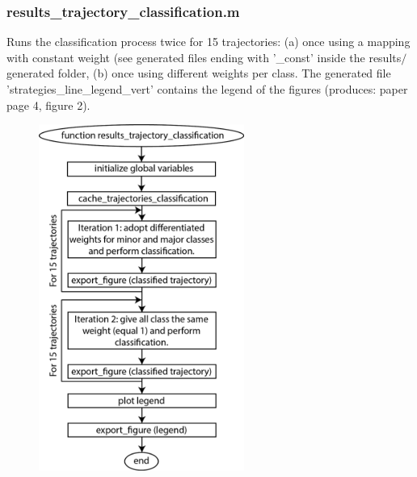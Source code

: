 \documentclass[12pt,titlepage]{article}
\begin{document}
\begin{doublespace}
\subsubsection{results\_trajectory\_classification.m}
Runs the classification process twice for 15 trajectories: (a) once using a mapping with constant weight (see generated files ending with '\_const' inside the results$/$generated folder, (b) once using different weights per class. The generated file 'strategies\_line\_legend\_vert' contains the legend of the figures (produces: paper page 4, figure 2).

\begin{figure}[H]
	\begin{center}
		\includegraphics[width=0.6\textwidth]{results_trajectory_classification.jpg}
		\label{fig2}
	\end{center}
\end{figure}


\end{doublespace}
\end{document}
